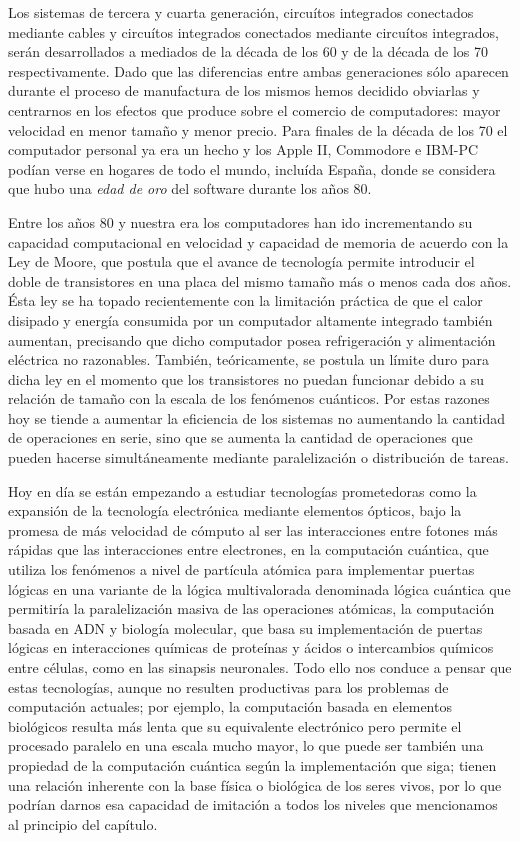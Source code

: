 \documentclass[12pt]{memoir}
\begin{document}
Los sistemas de tercera y cuarta generación, circuítos integrados conectados mediante cables y circuítos integrados conectados mediante circuítos integrados, serán desarrollados a mediados de la década de los 60 y de la década de los 70 respectivamente. Dado que las diferencias entre ambas generaciones sólo aparecen durante el proceso de manufactura de los mismos hemos decidido obviarlas y centrarnos en los efectos que produce sobre el comercio de computadores: mayor velocidad en menor tamaño y menor precio. Para finales de la década de los 70 el computador personal ya era un hecho y los Apple II, Commodore e IBM-PC podían verse en hogares de todo el mundo, incluída España, donde se considera que hubo una \textit{edad de oro} del software durante los años 80.

Entre los años 80 y nuestra era los computadores han ido incrementando su capacidad computacional en velocidad y capacidad de memoria de acuerdo con la Ley de Moore, que postula que el avance de tecnología permite introducir el doble de transistores en una placa del mismo tamaño más o menos cada dos años. Ésta ley se ha topado recientemente con la limitación práctica de que el calor disipado y energía consumida por un computador altamente integrado también aumentan, precisando que dicho computador posea refrigeración y alimentación eléctrica no razonables. También, teóricamente, se postula un límite duro para dicha ley en el momento que los transistores no puedan funcionar debido a su relación de tamaño con la escala de los fenómenos cuánticos. Por estas razones hoy se tiende a aumentar la eficiencia de los sistemas no aumentando la cantidad de operaciones en serie, sino que se aumenta la cantidad de operaciones que pueden hacerse simultáneamente mediante paralelización o distribución de tareas.

Hoy en día se están empezando a estudiar tecnologías prometedoras como la expansión de la tecnología electrónica mediante elementos ópticos, bajo la promesa de más velocidad de cómputo al ser las interacciones entre fotones más rápidas que las interacciones entre electrones, en la computación cuántica, que utiliza los fenómenos a nivel de partícula atómica para implementar puertas lógicas en una variante de la lógica multivalorada denominada lógica cuántica que permitiría la paralelización masiva de las operaciones atómicas, la computación basada en ADN y biología molecular, que basa su implementación de puertas lógicas en interacciones químicas de proteínas y ácidos o intercambios químicos entre células, como en las sinapsis neuronales. Todo ello nos conduce a pensar que estas tecnologías, aunque no resulten productivas para los problemas de computación actuales; por ejemplo, la computación basada en elementos biológicos resulta más lenta que su equivalente electrónico pero permite el procesado paralelo en una escala mucho mayor, lo que puede ser también una propiedad de la computación cuántica según la implementación que siga; tienen una relación inherente con la base física o biológica de los seres vivos, por lo que podrían darnos esa capacidad de imitación a todos los niveles que mencionamos al principio del capítulo.
\end{document}

